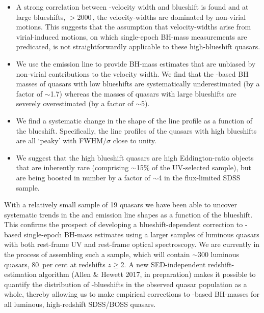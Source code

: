 \begin{itemize}

\item{A strong correlation between -velocity width and blueshift is found and at large blueshifts, $>$2000\,\kms, the velocity-widths are dominated by non-virial motions. 
This suggests that the assumption that velocity-widths arise from virial-induced motions, on which single-epoch BH-mass measurements are predicated, is not straightforwardly applicable to these high-blueshift quasars.}

\item{We use the \ha emission line to provide BH-mass estimates that are unbiased by non-virial contributions to the velocity width. 
We find that the -based BH masses of quasars with low  blueshifts are systematically underestimated (by a factor of $\sim$1.7) whereas the masses of quasars with large blueshifts are severely overestimated (by a factor of $\sim$5).} 

\item{We find a systematic change in the shape of the \ha line profile as a function of the  blueshift. 
Specifically, the \ha line profiles of the quasars with high  blueshifts are all `peaky' with FWHM/$\sigma$ close to unity.} 

\item{We suggest that the high  blueshift quasars are high Eddington-ratio objects that are inherently rare (comprising $\sim$15\% of the UV-selected sample), but are being boosted in number by a factor of $\sim$4 in the flux-limited SDSS sample.}

\end{itemize}

With a relatively small sample of 19 quasars we have been able to uncover systematic trends in the  and \ha emission line shapes as a function of the  blueshift.
This confirms the prospect of developing a blueshift-dependent correction to -based single-epoch BH-mass estimates using a larger samples of luminous quasars with both rest-frame UV and rest-frame optical spectroscopy. 
We are currently in the process of assembling such a sample, which will contain $\sim$300 luminous quasars, 80\, per cent at redshifts $z\geq$2.    
A new SED-independent redshift-estimation algorithm (Allen \& Hewett 2017, in preparation) makes it possible to quantify the distribution of -blueshifts in the observed quasar population as a whole, thereby allowing us to make empirical corrections to -based BH-masses for all luminous, high-redshift SDSS/BOSS quasars.


